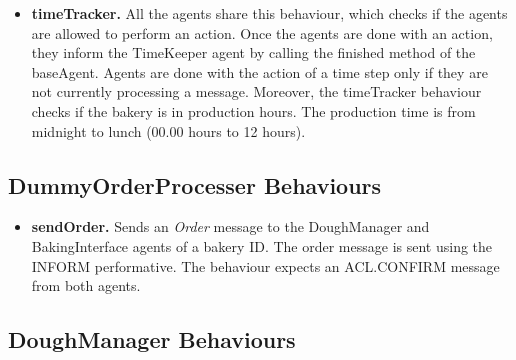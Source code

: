 \documentclass[paper=a4, fontsize=11pt]{scrartcl}
\begin{document}
	\begin{itemize}
		\item \textbf{timeTracker.} All the agents share this behaviour, which checks if the agents are allowed to perform an action. Once the agents are done with an action, they inform the TimeKeeper agent by calling the finished method of the baseAgent. Agents are done with the action of a time step only if they are not currently processing a message. Moreover, the timeTracker behaviour checks if the bakery is in production hours. The production time is from midnight to lunch (00.00 hours to 12 hours).

	\end{itemize}

	\subsection*{DummyOrderProcesser Behaviours}

	\begin{itemize}

		\item \textbf{sendOrder.} Sends an \textit{Order} message to the DoughManager and BakingInterface agents of a bakery ID. The order message is sent using the INFORM performative. The behaviour expects an ACL.CONFIRM message from both agents.

	\end{itemize}

	\subsection*{DoughManager Behaviours}
\end{document}
